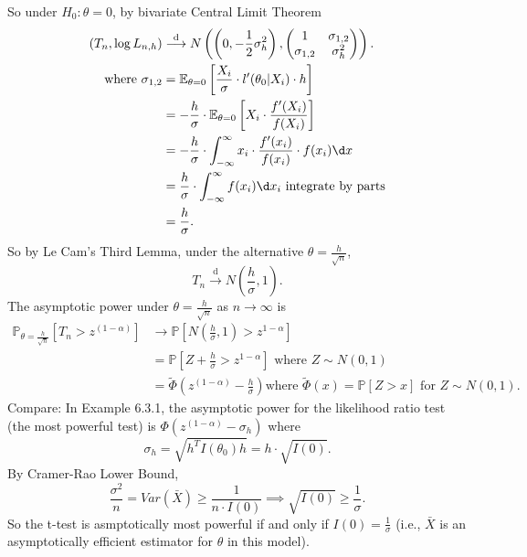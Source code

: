 \documentclass[a4paper]{article}
\begin{document}
\begin{eg}[T-test]
	So under $H_0: \theta = 0$, by bivariate Central Limit Theorem
	\begin{equation*}
		\begin{aligned}
			\left(T_n,\log L_{n,h}\right) & \stackrel{\text{d}}{\longrightarrow} N \left(\left(0,-\frac{1}{2} \sigma_h^2\right),
			\begin{pmatrix}
				1 & \sigma_{1,2} \\
				\sigma_{1,2} & \sigma_h^2
			\end{pmatrix}\right). \\
			\text{where } \sigma_{1,2} &= \mathbb{E}_{\theta = 0} \left[\frac{X_i}{\sigma} \cdot l'(\theta_0|X_i) \cdot h \right] \\
			&= -\frac{h}{\sigma} \cdot \mathbb{E}_{\theta = 0} \left[X_i \cdot \frac{f'(X_i)}{f(X_i)}\right] \\
			&= -\frac{h}{\sigma} \cdot \int_{-\infty}^{\infty} x_i \cdot \frac{f'(x_i)}{f(x_i)} \cdot f(x_i) \d x \\
			&= \frac{h}{\sigma} \cdot \int_{-\infty}^{\infty} f(x_i) \d x_i \text{ integrate by parts} \\
			&= \frac{h}{\sigma}.
		\end{aligned}
	\end{equation*}
	So by Le Cam's Third Lemma, under the alternative $\theta = \frac{h}{\sqrt{n}}$,
	\begin{equation*}
		T_n \stackrel{\text{d}}{\longrightarrow} N \left(\frac{h}{\sigma},1\right).
	\end{equation*}
	The asymptotic power under $\theta = \frac{h}{\sqrt{n}}$ as $n \to \infty$ is
	\begin{equation*}
		\begin{aligned}
			\mathbb{P}_{\theta = \frac{h}{\sqrt{n}}} [T_n > z^{(1-\alpha)}] &\to \mathbb{P}\left[N\left(\frac{h}{\sigma},1\right) > z^{1-\alpha}\right] \\
			&= \mathbb{P}\left[Z + \frac{h}{\sigma} > z^{1-\alpha}\right] \text{ where } Z \sim N(0,1) \\
			&= \tilde{\Phi}\left(z^{(1-\alpha)} - \frac{h}{\sigma}\right) \text{where $\tilde{\Phi}(x) = \mathbb{P}[Z > x]$ for $Z \sim N(0,1)$.}
		\end{aligned}
	\end{equation*}
	Compare: In Example 6.3.1, the asymptotic power for the likelihood ratio test (the most powerful test) is $\Phi\left(z^{(1-\alpha)}-\sigma_h\right)$ where
	\begin{equation*}
		\sigma_h = \sqrt{h^TI(\theta_0)h} = h \cdot \sqrt{I(0)}.
	\end{equation*}
	By Cramer-Rao Lower Bound,
	\begin{equation*}
		\frac{\sigma^2}{n} = Var(\bar{X}) \geq \frac{1}{n \cdot I(0)} \implies \sqrt{I(0)} \geq \frac{1}{\sigma}.
	\end{equation*}
	So the t-test is asmptotically most powerful if and only if $I(0) = \frac{1}{\sigma}$ (i.e., $\bar{X}$ is an asymptotically efficient estimator for $\theta$ in this model). 
\end{eg}
\end{document}
